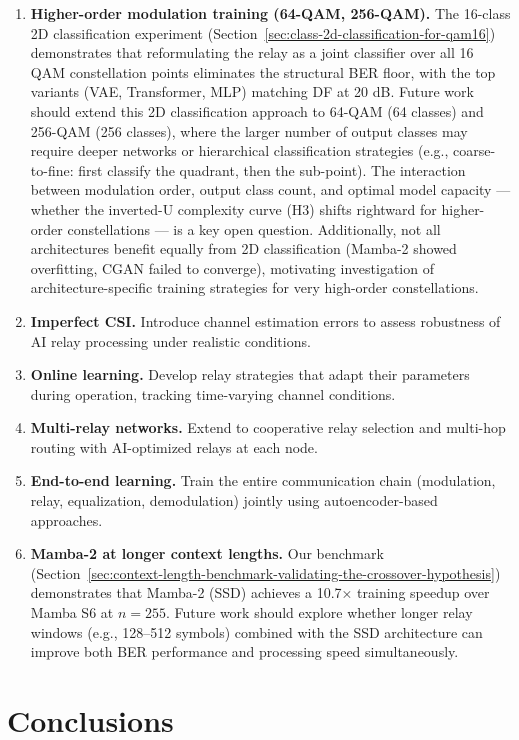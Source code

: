 \begin{enumerate}
\def\labelenumi{\arabic{enumi}.}
\item
  \textbf{Higher-order modulation training (64-QAM, 256-QAM).} The 16-class 2D classification experiment (Section~\ref{sec:class-2d-classification-for-qam16}) demonstrates that reformulating the relay as a joint classifier over all 16 QAM constellation points eliminates the structural BER floor, with the top variants (VAE, Transformer, MLP) matching DF at 20 dB. Future work should extend this 2D classification approach to 64-QAM (64 classes) and 256-QAM (256 classes), where the larger number of output classes may require deeper networks or hierarchical classification strategies (e.g., coarse-to-fine: first classify the quadrant, then the sub-point). The interaction between modulation order, output class count, and optimal model capacity --- whether the inverted-U complexity curve (H3) shifts rightward for higher-order constellations --- is a key open question. Additionally, not all architectures benefit equally from 2D classification (Mamba-2 showed overfitting, CGAN failed to converge), motivating investigation of architecture-specific training strategies for very high-order constellations.
\item
  \textbf{Imperfect CSI.} Introduce channel estimation errors to assess robustness of AI relay processing under realistic conditions.
\item
  \textbf{Online learning.} Develop relay strategies that adapt their parameters during operation, tracking time-varying channel conditions.
\item
  \textbf{Multi-relay networks.} Extend to cooperative relay selection and multi-hop routing with AI-optimized relays at each node.
\item
  \textbf{End-to-end learning.} Train the entire communication chain (modulation, relay, equalization, demodulation) jointly using autoencoder-based approaches.
\item
  \textbf{Mamba-2 at longer context lengths.} Our benchmark (Section~\ref{sec:context-length-benchmark-validating-the-crossover-hypothesis}) demonstrates that Mamba-2 (SSD) achieves a 10.7× training speedup over Mamba S6 at \(n = 255\). Future work should explore whether longer relay windows (e.g., 128--512 symbols) combined with the SSD architecture can improve both BER performance and processing speed simultaneously.
\end{enumerate}

\section{Conclusions}\label{sec:conclusions}

